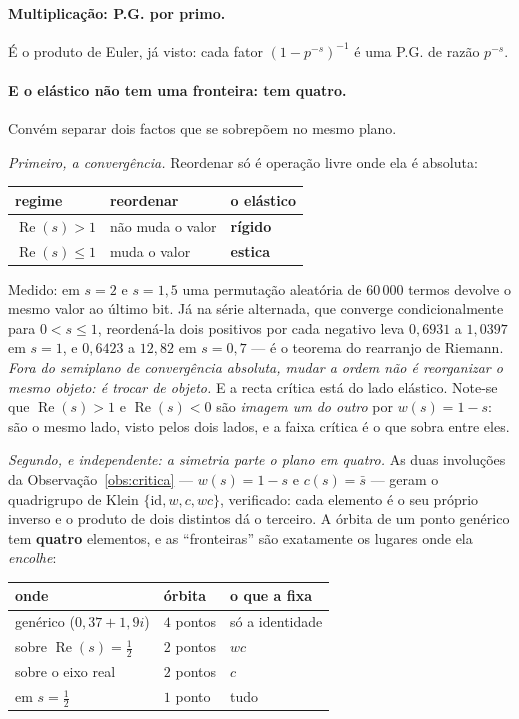 \documentclass[11pt,a4paper]{article}
\theoremstyle{plain}
\theoremstyle{definition}
\theoremstyle{remark}
\begin{document}
\paragraph{Multiplicação: P.G. por primo.} É o produto de Euler, já visto: cada fator
$(1-p^{-s})^{-1}$ é uma P.G. de razão $p^{-s}$.

\paragraph{E o elástico não tem uma fronteira: tem quatro.} Convém separar dois factos que se
sobrepõem no mesmo plano.

\emph{Primeiro, a convergência.} Reordenar só é operação livre onde ela é absoluta:

\begin{center}\small
\begin{tabular}{lll}
\hline
regime & reordenar & o elástico \\ \hline
$\operatorname{Re}(s)>1$ & não muda o valor & \textbf{rígido} \\
$\operatorname{Re}(s)\leq1$ & muda o valor & \textbf{estica} \\
\hline
\end{tabular}
\end{center}

\noindent Medido: em $s=2$ e $s=1{,}5$ uma permutação aleatória de $60\,000$ termos devolve o mesmo
valor ao último bit. Já na série alternada, que converge condicionalmente para $0<s\leq1$,
reordená-la dois positivos por cada negativo leva $0{,}6931$ a $1{,}0397$ em $s=1$, e $0{,}6423$ a
$12{,}82$ em $s=0{,}7$ --- é o teorema do rearranjo de Riemann. \emph{Fora do semiplano de
convergência absoluta, mudar a ordem não é reorganizar o mesmo objeto: é trocar de objeto.} E a
recta crítica está do lado elástico. Note-se que $\operatorname{Re}(s)>1$ e
$\operatorname{Re}(s)<0$ são \emph{imagem um do outro} por $w(s)=1-s$: são o mesmo lado, visto
pelos dois lados, e a faixa crítica é o que sobra entre eles.

\emph{Segundo, e independente: a simetria parte o plano em quatro.} As duas involuções da
Observação~\ref{obs:critica} --- $w(s)=1-s$ e $c(s)=\bar s$ --- geram o quadrigrupo de Klein
$\{\mathrm{id},w,c,wc\}$, verificado: cada elemento é o seu próprio inverso e o produto de dois
distintos dá o terceiro. A órbita de um ponto genérico tem \textbf{quatro} elementos, e as
``fronteiras'' são exatamente os lugares onde ela \emph{encolhe}:

\begin{center}\small
\begin{tabular}{lll}
\hline
onde & órbita & o que a fixa \\ \hline
genérico ($0{,}37+1{,}9i$) & $4$ pontos & só a identidade \\
sobre $\operatorname{Re}(s)=\tfrac12$ & $2$ pontos & $wc$ \\
sobre o eixo real & $2$ pontos & $c$ \\
em $s=\tfrac12$ & $1$ ponto & tudo \\
\hline
\end{tabular}
\end{center}
\end{document}
